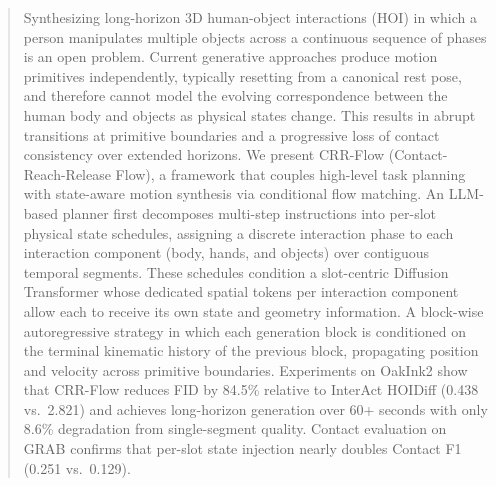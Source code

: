 \documentclass[sigconf, screen, review, anonymous]{acmart}
\begin{document}
\begin{abstract}
Synthesizing long-horizon 3D human-object interactions (HOI) in which a person manipulates multiple objects across a continuous sequence of phases is an open problem.
Current generative approaches produce motion primitives independently, typically resetting from a canonical rest pose, and therefore cannot model the evolving correspondence between the human body and objects as physical states change. This results in abrupt transitions at primitive boundaries and a progressive loss of contact consistency over extended horizons.
We present CRR-Flow (Contact-Reach-Release Flow), a framework that couples high-level task planning with state-aware motion synthesis via conditional flow matching.
An LLM-based planner first decomposes multi-step instructions into per-slot physical state schedules, assigning a discrete interaction phase to each interaction component (body, hands, and objects) over contiguous temporal segments.
These schedules condition a slot-centric Diffusion Transformer whose dedicated spatial tokens per interaction component allow each to receive its own state and geometry information.
A block-wise autoregressive strategy in which each generation block is conditioned on the terminal kinematic history of the previous block, propagating position and velocity across primitive boundaries.
Experiments on OakInk2 show that CRR-Flow reduces FID by 84.5\% relative to InterAct HOIDiff (0.438 vs.\ 2.821) and achieves long-horizon generation over 60+ seconds with only 8.6\% degradation from single-segment quality. Contact evaluation on GRAB confirms that per-slot state 
injection nearly doubles Contact F1 (0.251 vs.\ 0.129).
\end{abstract}
\end{document}
